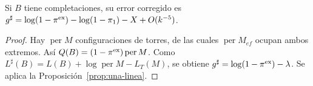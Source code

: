 \begin{corolario}\label{cor:linea-evitacion}
Si $B$ tiene completaciones, su error corregido es
$g^\sharp=\log(1-\pi^{\rm ex})-\log(1-\pi_1)-X+O(k^{-5})$.
\end{corolario}
\begin{proof}
Hay $\operatorname{per}M$ configuraciones de torres, de las cuales
$\operatorname{per}M_{ef}$ ocupan ambos extremos. Así
$Q(B)=(1-\pi^{\rm ex})\operatorname{per}M$. Como
$L^\sharp(B)=L(B)+\log\operatorname{per}M-L_T(M)$,
se obtiene $g^\sharp=\log(1-\pi^{\rm ex})-\lambda$. Se aplica la
Proposición~\ref{prop:una-linea}.
\end{proof}
